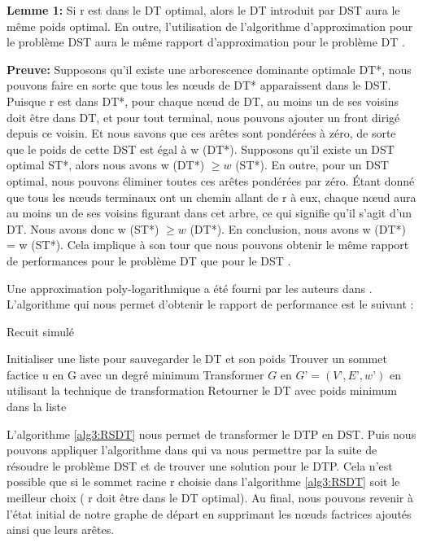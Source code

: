 \textbf{Lemme 1:}
Si r est dans le DT optimal, alors le DT introduit par DST aura le même poids optimal. En outre, l’utilisation de l’algorithme d’approximation pour le problème DST aura le même rapport d’approximation pour le problème DT \cite{shin2010approximation}.

\textbf{Preuve:}
Supposons qu'il existe une arborescence dominante optimale DT*, nous pouvons faire en sorte que tous les nœuds de DT* apparaissent dans le DST. Puisque r est dans DT*, pour chaque nœud de DT, au moins un de ses voisins doit être dans DT, et pour tout terminal, nous pouvons ajouter un front dirigé depuis ce voisin. Et nous savons que ces arêtes sont pondérées à zéro, de sorte que le poids de cette DST est égal à w (DT*). Supposons qu'il existe un DST optimal ST*, alors nous avons w (DT*) $\geq w$ (ST*). En outre, pour un DST optimal, nous pouvons éliminer toutes ces arêtes pondérées par zéro. Étant donné que tous les nœuds terminaux ont un chemin allant de r à eux, chaque nœud aura au moins un de ses voisins figurant dans cet arbre, ce qui signifie qu’il s’agit d’un DT. Nous avons donc w (ST*) $ \geq w$ (DT*). En conclusion, nous avons w (DT*) = w (ST*). Cela implique à son tour que nous pouvons obtenir le même rapport de performances pour le problème DT que pour le DST \cite{shin2010approximation}.

Une approximation poly-logarithmique a été fourni par les auteurs dans \cite{charikar1999approximation}.  L’algorithme qui  nous permet d’obtenir le rapport de performance est le suivant :

\begin{algorithm}[H]
\label{alg3:RSDT}
\caption{Recuit simulé}
\SetAlgoLined
\DontPrintSemicolon

Initialiser une liste pour sauvegarder le DT et son poids \;
Trouver un sommet factice u en G avec un degré minimum \;
Transformer $G$ en $G’ = (V’, E’, w’)$ en utilisant la technique de transformation\;
 Retourner le DT avec poids minimum dans la liste \;
\end{algorithm}


L’algorithme \ref{alg3:RSDT} nous permet de transformer le DTP en DST. Puis nous pouvons appliquer l’algorithme dans \cite{charikar1999approximation} qui va nous permettre par la suite de résoudre le problème DST et de trouver une solution pour le DTP. Cela n’est possible que si le sommet racine r choisie dans l’algorithme \ref{alg3:RSDT} soit le meilleur choix ( r doit être dans le DT optimal). Au final, nous pouvons revenir à l’état initial de  notre graphe de départ en supprimant les nœuds factrices ajoutés ainsi que leurs arêtes. 


